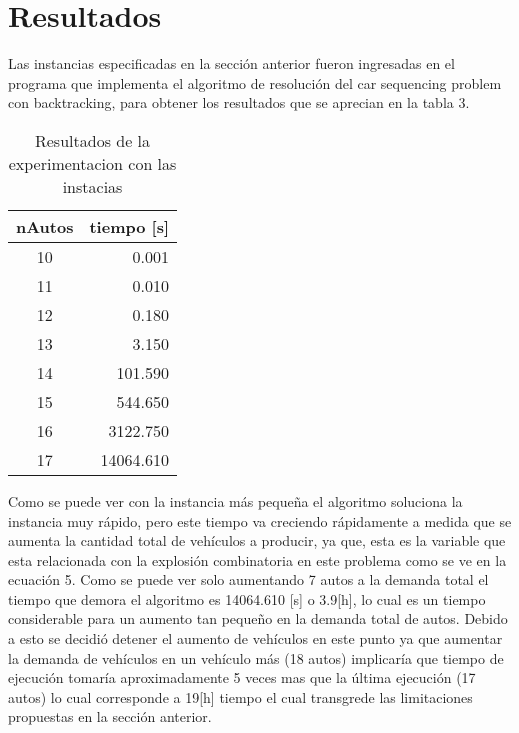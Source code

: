 \documentclass[letter, 10pt]{article}
\begin{document}
\section{Resultados}
Las instancias especificadas en la secci\'on anterior fueron ingresadas en el programa que implementa el algoritmo de resoluci\'on del car sequencing problem con backtracking, para obtener los resultados que se aprecian en la tabla 3.
\begin{table}[H]
\centering
\begin{tabular}{|c|r|}
\hline
nAutos & \multicolumn{1}{c|}{tiempo {[}s{]}} \\ \hline
10     & 0.001                              \\ \hline
11     & 0.010                               \\ \hline
12     & 0.180                              \\ \hline
13     & 3.150                              \\ \hline
14     & 101.590                             \\ \hline
15     & 544.650                             \\ \hline
16     & 3122.750                            \\ \hline
17     & 14064.610                           \\ \hline
\end{tabular}
\caption{Resultados de la experimentacion con las instacias}
\end{table}
Como se puede ver con la instancia m\'as peque\~{n}a el algoritmo soluciona la instancia muy r\'apido, pero este tiempo va creciendo r\'apidamente a medida que se aumenta la cantidad total de veh\'iculos a producir, ya que, esta es la variable que esta relacionada con la explosi\'on combinatoria en este problema como se ve en la ecuaci\'on 5. Como se puede ver solo aumentando 7 autos a la demanda total el tiempo que demora el algoritmo es 14064.610 [s] o 3.9[h], lo cual es un tiempo considerable para un aumento tan peque\~{n}o en la demanda total de autos. Debido a esto se decidi\'o detener el aumento de veh\'iculos en este punto ya que aumentar la demanda de veh\'iculos en un veh\'iculo m\'as (18 autos) implicar\'ia que tiempo de ejecuci\'on tomar\'ia aproximadamente 5 veces mas que la \'ultima ejecuci\'on (17 autos) lo cual corresponde a 19[h] tiempo el cual transgrede las limitaciones propuestas en la secci\'on anterior.
\end{document}
